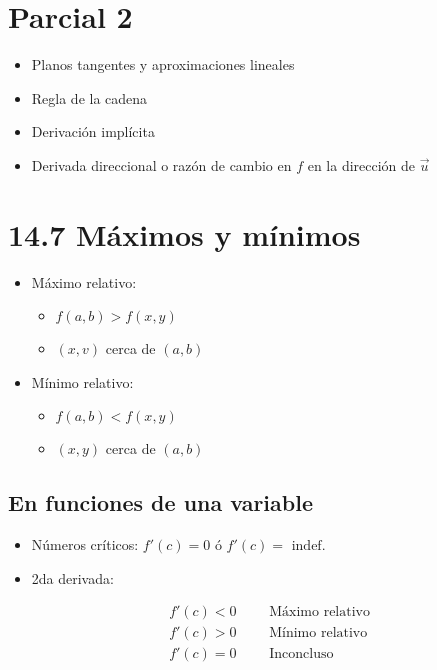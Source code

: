 \section{Parcial 2}
\begin{itemize}
    \item Planos tangentes y aproximaciones lineales 
    \item Regla de la cadena 
    \item Derivación implícita 
    \item Derivada direccional o razón de cambio en $f$ en la dirección de $\vec{u}$
\end{itemize}

\section{14.7 Máximos y mínimos}

\begin{itemize}
    \item Máximo relativo:
        \begin{itemize}
            \item $\displaystyle f(a,b) > f(x,y)$
            \item $(x,v)$ cerca de $(a,b)$
        \end{itemize}   

    
    \item Mínimo relativo:
        \begin{itemize}
            \item $\displaystyle f(a,b) < f(x,y)$
            \item $(x,y)$ cerca de $(a,b)$
        \end{itemize}
\end{itemize}

\subsection{En funciones de una variable}
\begin{itemize}
    \item Números críticos: $\displaystyle f'(c)=0$ ó $\displaystyle f'(c) = \text{ indef}.$
    \item 2da derivada: 
        \begin{center}
            \begin{align*}
                f'(c) < 0 \qquad \text{ Máximo relativo } \\ 
                f'(c) > 0 \qquad \text{ Mínimo relativo } \\ 
                f'(c) = 0 \qquad \text{ Inconcluso } \\ 
            \end{align*}
        \end{center}
\end{itemize}

